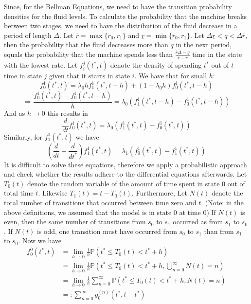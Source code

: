 Since, for the Bellman Equations, we need to have the transition probability densities for the fluid levels. To calculate the probability that the machine breaks between two stages, we need to have the distribution of the fluid decrease in a period of length $\Delta$. Let $\overline{r}=\max\{r_0,r_1\}$ and $\underline{r}=\min\{r_0,r_1\}$. Let $\Delta\underline{r}<q<\Delta\overline{r}$, then the probability that the fluid decreases more than $q$ in the next period, equals the probability that the machine spends less than $\frac{\overline{r}\Delta-q}{\overline{r}-\underline{r}}$ time in the state with the lowest rate.
Let $f_{i}^j(t^*,t)$ denote the density of spending $t^*$ out of $t$ time in state $j$ given that it starts in state $i$. We have that for small $h$:
$$
f_{0}^1(t^*,t)=\lambda_0hf_1^1(t^*,t-h)+(1-\lambda_0h)f_{0}^1(t^*,t-h)
$$
$$
\Rightarrow \frac{f_{0}^1(t^*,t)-f_{0}^1(t^*,t-h)}{h}=\lambda_0(f_1^1(t^*,t-h)-f_{0}^1(t^*,t-h))
$$
And as $h\rightarrow 0$ this results in
$$
\frac{d}{dt}f_{0}^1(t^*,t)=\lambda_0(f_1^1(t^*,t)-f_{0}^1(t^*,t))
$$
Similarly, for $f_1^1(t^*,t)$ we have
$$
(\frac{d}{dt}+\frac{d}{dt^*})f_1^1(t^*,t)=\lambda_1(f_0^1(t^*,t)-f_1^1(t^*,t))
$$
It is difficult to solve these equations, therefore we apply a probabilistic approach and check whether the results adhere to the differential equations afterwards. 
Let $T_0(t)$ denote the random variable of the amount of time spent in state 0 out of total time $t$. Likewise $T_1(t)=t-T_0(t)$. Furthermore, Let $N(t)$ denote the total number of transitions that occurred between time zero and $t$. (Note: in the above definitions, we assumed that the model is in state 0 at time 0) If $N(t)$ is even, then the same number of transitions from $s_0$ to $s_1$ occurred as from $s_1$ to $s_0$. If $N(t)$ is odd, one transition must have occurred from $s_0$ to $s_1$ than from $s_1$ to $s_0$. Now we have
\begin{equation}
\begin{split}
	f_0^0(t^*,t) & =\lim\limits_{h\rightarrow 0}\frac{1}{h}\mathbb{P}(t^*\leq T_0(t)<t^*+h) \\
	 & =\lim\limits_{h\rightarrow 0}\frac{1}{h}\mathbb{P}(t^*\leq T_0(t)<t^*+h,\bigcup\limits_{n=0}^\infty N(t)=n) \\
	 & =\lim\limits_{h\rightarrow 0}\frac{1}{h}\sum\limits_{n=0}^\infty \mathbb{P}(t^*\leq T_0(t)<t^*+h, N(t)=n)\\
	  & =:\sum\limits_{n=0}^\infty g_0^{(n)}(t^*,t-t^*)
\end{split}
\end{equation}
